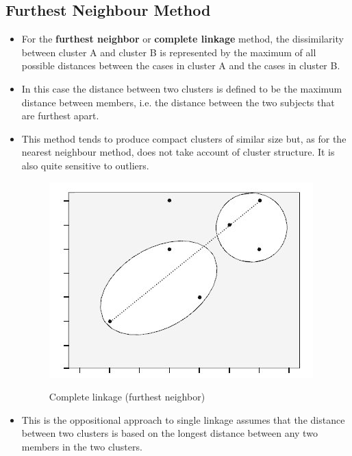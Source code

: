 \documentclass[a4paper,12pt]{article}
\begin{document}
\subsection{Furthest Neighbour Method} 
\begin{itemize}	
	\item For the \textbf{furthest neighbor} or \textbf{complete linkage} method, the dissimilarity between cluster A and cluster B is represented by the maximum of all possible distances between the cases in cluster A and the cases in cluster B.
	\item 
	In this case the distance between two clusters is defined to be the maximum distance
	between members, i.e. the distance between the two subjects that are furthest apart.
\item This method tends to produce compact clusters of similar size but, as for the nearest
	neighbour method, does not take account of cluster structure. It is also quite sensitive
	to outliers.

	\begin{figure}[h!]
		\begin{center}
			\includegraphics[scale=0.4]{images/Link2.jpg}\\
			\caption{Complete linkage (furthest neighbor)}
		\end{center}
	\end{figure}
		\item  This is the oppositional approach to single
		linkage assumes that the distance between two clusters is based on the longest
		distance between any two members in the two clusters.
\end{itemize}
\end{document}
